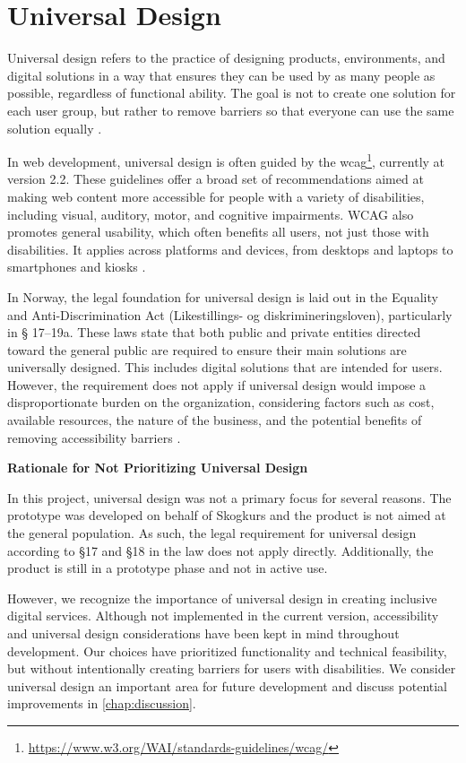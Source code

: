 \section{Universal Design}

Universal design refers to the practice of designing products, environments, and digital solutions in a way that ensures they can be used by as many people as possible, regardless of functional ability. The goal is not to create one solution for each user group, but rather to remove barriers so that everyone can use the same solution equally \cite{uutilsynet}.

In web development, universal design is often guided by the \acrfull{wcag}\footnote{\url{https://www.w3.org/WAI/standards-guidelines/wcag/}}, currently at version 2.2. These guidelines offer a broad set of recommendations aimed at making web content more accessible for people with a variety of disabilities, including visual, auditory, motor, and cognitive impairments. WCAG also promotes general usability, which often benefits all users, not just those with disabilities. It applies across platforms and devices, from desktops and laptops to smartphones and kiosks \cite{wcag}.

In Norway, the legal foundation for universal design is laid out in the Equality and Anti-Discrimination Act (Likestillings- og diskrimineringsloven), particularly in § 17–19a. These laws state that both public and private entities directed toward the general public are required to ensure their main solutions are universally designed. This includes digital solutions that are intended for users. However, the requirement does not apply if universal design would impose a disproportionate burden on the organization, considering factors such as cost, available resources, the nature of the business, and the potential benefits of removing accessibility barriers \cite{lovdata}.

\textbf{Rationale for Not Prioritizing Universal Design}

In this project, universal design was not a primary focus for several reasons. The prototype was developed on behalf of Skogkurs and the product is not aimed at the general population. As such, the legal requirement for universal design according to §17 and §18 in the law does not apply directly. Additionally, the product is still in a prototype phase and not in active use.

However, we recognize the importance of universal design in creating inclusive digital services. Although not implemented in the current version, accessibility and universal design considerations have been kept in mind throughout development. Our choices have prioritized functionality and technical feasibility, but without intentionally creating barriers for users with disabilities. We consider universal design an important area for future development and discuss potential improvements in \autoref{chap:discussion}.

